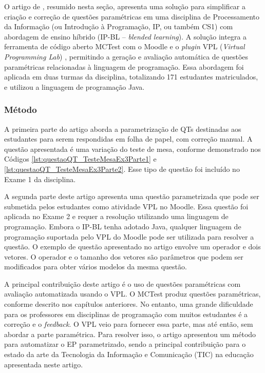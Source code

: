 O artigo de , resumido nesta seção, apresenta uma solução para simplificar a criação e correção de questões paramétricas em uma disciplina de Processamento da Informação (ou Introdução à Programação, IP, ou também CS1) com abordagem de ensino híbrido (IP-BL -- \textit{blended learning}). A solução integra a ferramenta de código aberto MCTest com o Moodle e o \textit{plugin} VPL (\textit{Virtual Programming Lab}) \cite{rodriguez2012virtual}, permitindo a geração e avaliação automática de questões paramétricas relacionadas à linguagem de programação. Essa abordagem foi aplicada em duas turmas da disciplina, totalizando 171 estudantes matriculados, e utilizou a linguagem de programação Java.

\subsubsection{Método}

A primeira parte do artigo aborda a parametrização de QTs destinadas aos estudantes para serem respondidas em folha de papel, com correção manual. A questão apresentada é uma variação do teste de mesa, conforme demonstrado nos Códigos \ref{lst:questaoQT_TesteMesaEx3Parte1} e \ref{lst:questaoQT_TesteMesaEx3Parte2}. Esse tipo de questão foi incluído no Exame 1 da disciplina.

A segunda parte deste artigo apresenta uma questão parametrizada que pode ser submetida pelos estudantes como atividade VPL no Moodle. Essa questão foi aplicada no Exame 2 e requer a resolução utilizando uma linguagem de programação. Embora o IP-BL tenha adotado Java, qualquer linguagem de programação suportada pelo VPL do Moodle pode ser utilizada para resolver a questão. O exemplo de questão apresentado no artigo envolve um operador e dois vetores. O operador e o tamanho dos vetores são parâmetros que podem ser modificados para obter vários modelos da mesma questão. 

A principal contribuição deste artigo é o uso de questões paramétricas com avaliação automatizada usando o VPL. O MCTest produz questões paramétricas, conforme descrito nos capítulos anteriores. No entanto, uma grande dificuldade para os professores em disciplinas de programação com muitos estudantes é a correção e o \textit{feedback}. O VPL veio para fornecer essa parte, mas até então, sem abordar a parte paramétrica. Para resolver isso, o artigo apresentou um método para automatizar o EP parametrizado, sendo a principal contribuição para o estado da arte da Tecnologia da Informação e Comunicação (TIC) na educação apresentada neste artigo.

